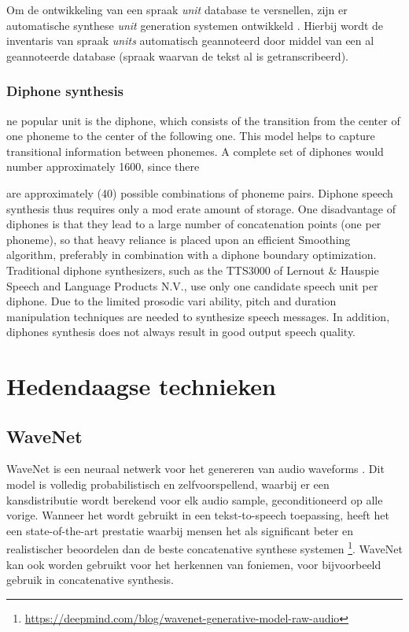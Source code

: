 Om de ontwikkeling van een spraak \textit{unit} database te versnellen, zijn er automatische synthese \textit{unit} generation systemen ontwikkeld \cite{nakajima1994automatic}. Hierbij wordt de inventaris van spraak \textit{units} automatisch geannoteerd door middel van een al geannoteerde database (spraak waarvan de tekst al is getranscribeerd).


\subsubsection{Diphone synthesis}
ne popular unit is the diphone, which consists of the transition from the center of one phoneme to the center of the following one. This model helps to capture transitional information between phonemes. A complete set of diphones would number approximately 1600, since there

are approximately (40) possible combinations of phoneme pairs. Diphone speech synthesis thus requires only a mod erate amount of storage. One disadvantage of diphones is that they lead to a large number of concatenation points (one per phoneme), so that heavy reliance is placed upon an efficient Smoothing algorithm, preferably in combination with a diphone boundary optimization. Traditional diphone synthesizers, such as the TTS3000 of Lernout & Hauspie Speech and Language Products N.V., use only one candidate speech unit per diphone. Due to the limited prosodic vari ability, pitch and duration manipulation techniques are needed to synthesize speech messages. In addition, diphones synthesis does not always result in good output speech quality.



\section{Hedendaagse technieken}

\subsection{WaveNet}
WaveNet is een neuraal netwerk voor het genereren van audio waveforms \cite{45774}. Dit model is volledig probabilistisch en zelfvoorspellend, waarbij er een kansdistributie wordt berekend voor elk audio sample, geconditioneerd op alle vorige. Wanneer het wordt gebruikt in een tekst-to-speech toepassing, heeft het een state-of-the-art prestatie waarbij mensen het als significant beter en realistischer beoordelen dan de beste concatenative synthese systemen \footnote{\url{https://deepmind.com/blog/wavenet-generative-model-raw-audio}}. WaveNet kan ook worden gebruikt voor het herkennen van foniemen, voor bijvoorbeeld gebruik in concatenative synthesis.

